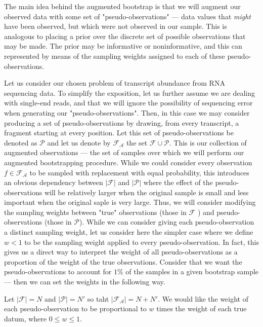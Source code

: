 The main idea behind the augmented bootstrap is that we will augment our observed data with some set 
of "pseudo-observations" --- data values that \textit{might} have been observed, but which were not observed 
in our sample.  This is analogous to placing a prior over the discrete set of possible observations 
that may be made. The prior may be informative or noninformative, and this can represented by means 
of the sampling weights assigned to each of these pseudo-observations.

Let us consider our chosen problem of transcript abundance from RNA sequencing data. To simplify the 
exposition, let us further assume we are dealing with single-end reads, and that we will ignore the 
possibility of sequencing error when generating our "pseudo-observations". Then, in this case we 
may consider producing a set of pseudo-observations by drawing, from every transcript, a fragment 
starting at every position.  Let this set of pseudo-observations be denoted as $\mathcal{P}$ and 
let us denote by $\mathcal{F_{A}}$ the set $\mathcal{F} \cup \mathcal{P}$. This is our collection 
of augmented observations — the set of samples over which we will perform our augmented 
bootstrapping procedure.  While we could consider every observation $f \in \mathcal{F_{A}}$ to be 
sampled with replacement with equal probability, this introduces an obvious dependency between 
$\left|\mathcal{F}\right|$ and $\left|\mathcal{P}\right|$ where the effect of the 
pseudo-observations will be relatively larger when the original sample is small and less important 
when the original saple is very large.  Thus, we will consider modifying the sampling weights 
between "true" observations (those in $\mathcal{F}$ ) and pseudo-observations 
(those in $\mathcal{P}$).  While we can consider giving each pseudo-observation a distinct sampling 
weight, let us consider here the simpler case where we define $w < 1$ to be the sampling weight 
applied to every pseudo-observation.  In fact, this gives us a direct way to interpret the weight 
of all pseudo-observations as a proportion of the weight of the true observations.  Consider that 
we want the pseudo-observations to account for $1\%$ of the samples in a given bootstrap sample — 
then we can set the weights in the following way.

Let $\left|\mathcal{F}\right| = N$ and $\left| \mathcal{P} \right| = N'$ so taht 
$\left| \mathcal{F_{A}} \right| = N + N'$.  We would like the weight of each pseudo-observation 
to be proportional to $w$ times the weight of each true datum, where $0 \le w \le 1$. 

